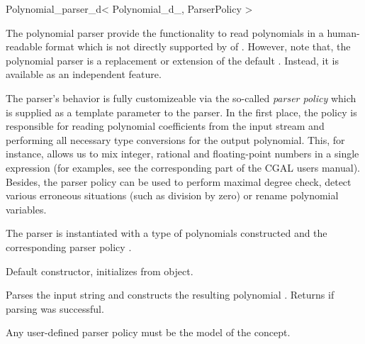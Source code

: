 % 
% 



\begin{ccRefClass}{Polynomial_parser_d< Polynomial_d_, ParserPolicy >}
\def\ccTagOperatorLayout{\ccFalse}


\ccDefinition

The polynomial parser provide the functionality to read polynomials in a human-readable format which
is not directly supported by  of . However, note that,
the polynomial parser is  a replacement or extension of the default . Instead,
it is available as an independent feature.

The parser's behavior is fully customizeable via the so-called {\em parser policy} 
which is supplied as a template parameter to the parser. 
In the first place, the policy is responsible for reading polynomial 
coefficients from the input stream and performing all necessary type conversions
for the output polynomial. This, for instance, allows us to mix integer, rational and 
floating-point numbers in a single expression (for examples, see the corresponding part of 
the CGAL users manual).
Besides, the parser policy can be used to perform maximal degree check,
detect various erroneous situations (such as division by zero) 
or rename polynomial variables.

\ccParameters
The parser is instantiated with a type 
of polynomials constructed  and the corresponding parser policy . 


\ccCreation
{}

% 

{Default constructor, initializes from  object.}

\ccOperations

{Parses the input string  and constructs the resulting polynomial . 
Returns  if parsing was successful.} 

Any user-defined parser policy must be the model of the 
concept.

\ccSeeAlso
{}

\end{ccRefClass}

